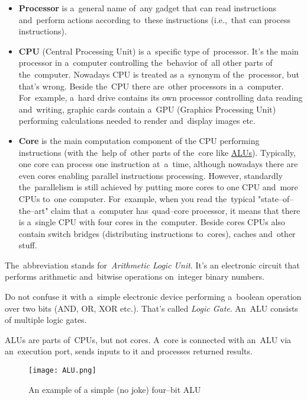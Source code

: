 \begin{itemize}
    \item \textbf{Processor} is a~general name of~any gadget that can read instructions and~perform actions according to~these instructions (i.e.,~that can process instructions).
    \item \textbf{CPU} (Central Processing Unit) is a~specific type of~processor. It's the main processor in a~computer controlling the~behavior of~all other parts of the~computer. Nowadays CPU is treated as a~synonym of the~processor, but that's wrong. Beside the~CPU there are~other processors in a~computer. For~example, a~hard drive contains its own processor controlling data reading and~writing, graphic cards contain a~GPU (Graphics Processing Unit) performing calculations needed to render and~display images etc.
    \item \textbf{Core} is the main computation component of the CPU performing instructions (with the~help of~other parts of the~core like \hyperref[alu]{ALUs}). Typically, one core can process one instruction at~a~time, although nowadays there are even cores enabling parallel instructions processing. However, standardly the~parallelism is still achieved by putting more cores to one CPU and~more CPUs to~one computer. For~example, when you read the~typical "state--of--the--art" claim that a~computer has~quad--core processor, it means that there is a~single CPU with four cores in the~computer. Beside cores CPUs also contain switch bridges (distributing instructions to~cores), caches and~other stuff.
\end{itemize}

\label{32bvs64b}

\label{alu}
The~abbreviation stands for~\textit{Arithmetic Logic Unit}. It's an electronic circuit that performs arithmetic and~bitwise operations on~integer binary numbers.

\warning Do not confuse it with a~simple electronic device performing a~boolean operation over two bits (AND, OR, XOR etc.). That's called \textit{Logic Gate}. An~ALU consists of multiple logic gates.

\warning ALUs are parts of~CPUs, but not cores. A~core is connected with an~ALU via an~execution port, sends inputs to it and processes returned results.

\begin{figure}
    \centering
    \texttt{[image: ALU.png]}
    \caption*{An example of a simple (no joke) four--bit ALU}
\end{figure}
